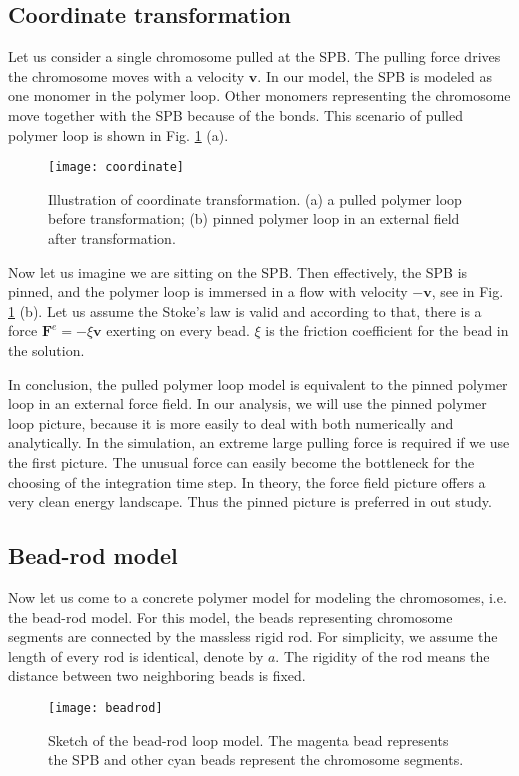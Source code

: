 \subsection{Coordinate transformation}
\label{sub:coordinate_transformation}
Let us consider a single chromosome pulled at the SPB. The pulling force drives the chromosome moves with a velocity $\mathbf{v}$. In our model, the SPB is modeled as one monomer in the polymer loop. Other monomers representing the chromosome move together with the SPB because of the bonds. This scenario of pulled polymer loop is shown in Fig. \ref{fig:coordinate} (a). 
\begin{figure}[htpb]
    \centering
    \texttt{[image: coordinate]}
    \caption{Illustration of coordinate transformation. (a) a pulled polymer loop before transformation; (b) pinned polymer loop in an external field after transformation. }
    \label{fig:coordinate}
\end{figure}

Now let us imagine we are sitting on the SPB. Then effectively, the SPB is pinned, and the polymer loop is immersed in a flow with velocity $-\mathbf{v}$, see in Fig. \ref{fig:coordinate} (b). Let us assume the Stoke's law is valid and according to that, there is a force $\mathbf{F}^e = - \xi \mathbf{v}$ exerting on every bead. $\xi$ is the friction coefficient for the bead in the solution.

In conclusion, the pulled polymer loop model is equivalent to the pinned polymer loop in an external force field. In our analysis, we will use the pinned polymer loop picture, because it is more easily to deal with both numerically and analytically. In the simulation, an extreme large pulling force is required if we use the first picture. The unusual force can easily become the bottleneck for the choosing of the integration time step. In theory, the force field picture offers a very clean energy landscape. Thus the pinned picture is preferred in out study. 

\subsection{Bead-rod model}
\label{sub:bead_rod_model}
Now let us come to a concrete polymer model for modeling the chromosomes, i.e. the bead-rod model. For this model, the beads representing chromosome segments are connected by the massless rigid rod. For simplicity, we assume the length of every rod is identical, denote by $a$. The rigidity of the rod means the distance between two neighboring beads is fixed. 
\begin{figure}[htpb]
    \centering
    \texttt{[image: beadrod]}
    \caption{Sketch of the bead-rod loop model. The magenta bead represents the SPB and other cyan beads represent the chromosome segments.}
    \label{fig:beadrod}
\end{figure}

